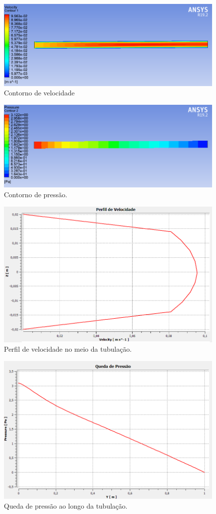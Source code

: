\documentclass[12pt]{article}
\begin{document}
\begin{figure}[H]
    \centering
    \includegraphics[width=.5\textwidth]{fig/velocity_contour_turbulent.png}
    \caption{Contorno de velocidade}
		\label{fig:isometric}
\end{figure}

\begin{figure}[H]
    \centering
    \includegraphics[width=.5\textwidth]{fig/pressure_contour_turbulent.png}
    \caption{Contorno de pressão.}
		\label{fig:isometric}
\end{figure}

\begin{figure}[H]
    \centering
    \includegraphics[width=.5\textwidth]{fig/velocity_profile_turbulent.png}
    \caption{Perfil de velocidade no meio da tubulação.}
		\label{fig:isometric}
\end{figure}

\begin{figure}[H]
    \centering
    \includegraphics[width=.5\textwidth]{fig/pressure_loss_turbulent.png}
    \caption{Queda de pressão ao longo da tubulação.}
		\label{fig:isometric}
\end{figure}
\end{document}
